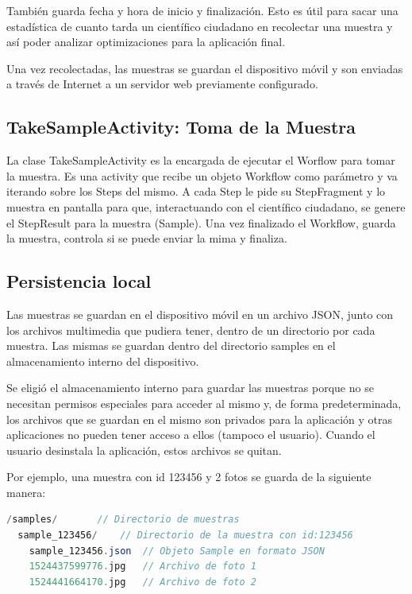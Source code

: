 También guarda fecha y hora de inicio y finalización. Esto es útil para sacar una estadística de cuanto tarda un científico ciudadano en recolectar una muestra y así poder analizar optimizaciones para la aplicación final.

Una vez recolectadas, las muestras se guardan el dispositivo móvil y son enviadas a través de Internet a un servidor web previamente configurado.

\subsection{TakeSampleActivity: Toma de la Muestra}
La clase TakeSampleActivity es la encargada de ejecutar el Worflow para tomar la muestra. Es una activity que recibe un objeto Workflow como parámetro y va iterando sobre los Steps del mismo. A cada Step le pide su StepFragment y lo muestra en pantalla para que, interactuando con el científico ciudadano, se genere el StepResult para la muestra (Sample). Una vez finalizado el Workflow, guarda la muestra, controla si se puede enviar la mima y finaliza.



\subsection{Persistencia local}
Las muestras se guardan en el dispositivo móvil en un archivo JSON, junto con los archivos multimedia que pudiera tener, dentro de un directorio por cada muestra. Las mismas se guardan dentro del directorio samples en el almacenamiento interno del dispositivo.

Se eligió el almacenamiento interno para guardar las muestras porque no se necesitan permisos especiales para acceder al mismo y, de forma predeterminada, los archivos que se guardan en el mismo son privados para la aplicación y otras aplicaciones no pueden tener acceso a ellos (tampoco el usuario). Cuando el usuario desinstala la aplicación, estos archivos se quitan\cite{androidInternalStorage}.

Por ejemplo, una muestra con id 123456 y 2 fotos se guarda de la siguiente manera:
\begin{lstlisting}[language=Java, frame=tlb]
/samples/		// Directorio de muestras
  sample_123456/	// Directorio de la muestra con id:123456 
    sample_123456.json	// Objeto Sample en formato JSON
    1524437599776.jpg	// Archivo de foto 1
    1524441664170.jpg	// Archivo de foto 2
\end{lstlisting}

